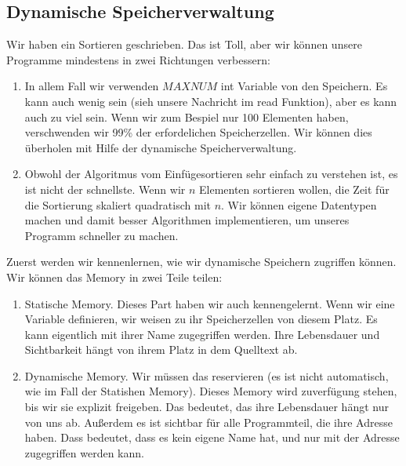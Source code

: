 \documentclass{article}[12pt]
\begin{document}
\subsection{Dynamische Speicherverwaltung}
Wir haben ein Sortieren geschrieben. Das ist Toll, aber wir können unsere Programme mindestens in zwei Richtungen
verbessern:
\begin{enumerate}
\item In allem Fall wir verwenden $MAXNUM$ int Variable von den Speichern. Es kann auch wenig sein (sieh unsere
Nachricht im read Funktion), aber es kann auch zu viel sein. Wenn wir zum Bespiel nur 100 Elementen haben, verschwenden
wir 99\% der erfordelichen Speicherzellen. Wir können dies überholen mit Hilfe der dynamische Speicherverwaltung.
\item
Obwohl der Algoritmus vom Einfügesortieren sehr einfach zu verstehen ist, es ist nicht der schnellste. Wenn wir 
$n$ Elementen sortieren wollen, die Zeit für die Sortierung skaliert quadratisch mit $n$. Wir können 
eigene Datentypen machen und damit besser Algorithmen implementieren, um unseres Programm schneller zu machen.
\end{enumerate}
Zuerst werden wir kennenlernen, wie wir dynamische Speichern zugriffen können. Wir können das Memory in zwei Teile teilen:
\begin{enumerate}
\item Statische Memory. Dieses Part haben wir auch kennengelernt. Wenn wir eine Variable definieren, wir weisen zu ihr
Speicherzellen von diesem Platz. Es kann eigentlich mit ihrer Name zugegriffen werden. Ihre Lebensdauer und Sichtbarkeit 
hängt von ihrem Platz in dem Quelltext ab.
\item Dynamische Memory. Wir müssen das reservieren (es ist nicht automatisch, wie im Fall der Statishen Memory).
Dieses Memory wird zuverfügung stehen, bis wir sie explizit freigeben. Das bedeutet, das ihre Lebensdauer 
hängt nur von uns ab. Außerdem es ist sichtbar für alle Programmteil, die ihre Adresse haben. Dass
bedeutet, dass es kein eigene Name hat, und nur mit der Adresse zugegriffen werden kann.
\end{enumerate}
\end{document}
